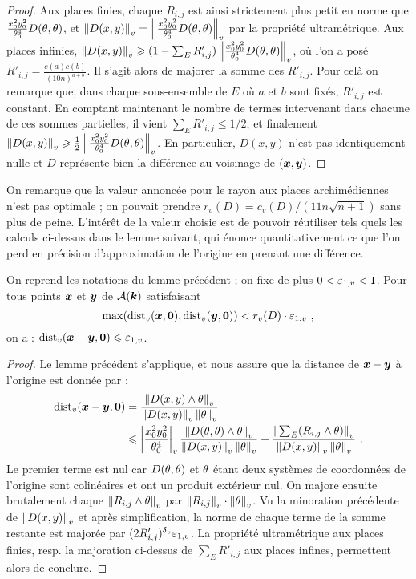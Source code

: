 \begin{proof}
  Aux places finies, chaque $R_{i, j}$ est ainsi strictement plus petit en
  norme que $\frac{x_0^2y_0^2}{\theta_0^4}D(\theta, \theta)$, et $\left\lVert D(x, y)\right\rVert_{v} =
  \left\lVert\frac{x_0^2y_0^2}{\theta_0^4}D(\theta, \theta)\right\rVert_{v}$ par la propriété
  ultramétrique.  Aux places infinies, $\left\lVert D(x, y)\right\rVert_{v} \geqslant (1-\sum_E R'_{i, j})
  \left\lVert\frac{x_0^2y_0^2}{\theta_0^4}D(\theta, \theta)\right\rVert_{v}$, où l'on a posé $R'_{i, j} =
  \frac{c(a)c(b)}{ \left( 10n \right)^{a+b}}$. Il s'agit alors de majorer la
  somme des $R'_{i, j}$. Pour celà on remarque que, dans chaque sous-ensemble
  de $E$ où $a$ et $b$ sont fixés, $R'_{i, j}$ est constant. En comptant
  maintenant le nombre de termes intervenant dans chacune de ces sommes
  partielles, il vient $\sum_E R'_{i, j} \le 1/2$, et finalement $\left\lVert D(x, y)\right\rVert_{v}
  \geqslant \frac{1}{2} \left\lVert\frac{x_0^2y_0^2}{\theta_0^4}D(\theta, \theta)\right\rVert_{v}$. En
  particulier, $D(x, y)$ n'est pas identiquement nulle et $D$ représente bien
  la différence au voisinage de $({\boldsymbol{x}}, {\boldsymbol{y}})$.
\end{proof}

On remarque que la valeur annoncée pour le rayon aux places archimédiennes
n'est pas optimale ; on pouvait prendre $r_v(D) = c_v(D)/(11n\sqrt{n+1})$ sans
plus de peine. L'intérêt de la valeur choisie est de pouvoir réutiliser tels
quels les calculs ci-dessus dans le lemme suivant, qui énonce quantitativement
ce que l'on perd en précision d'approximation de l'origine en prenant une
différence.

\begin{lem} \label{DistRel}
  On reprend les notations du lemme précédent ; on fixe de plus $0 < \varepsilon_{1,
  v} < 1$. Pour tous points ${\boldsymbol{x}}$ et ${\boldsymbol{y}}$ de $\mathcal{A}(\boldsymbol{k})$ satisfaisant
  \[
  \max ( \mathrm{dist}_v({\boldsymbol{x}}, {\boldsymbol{0}}), \mathrm{dist}_v({\boldsymbol{y}}, {\boldsymbol{0}}) ) < r_v(D) \cdot \varepsilon_{1,v} \text{ ,}
  \]
  on a : $\mathrm{dist}_v({\boldsymbol{x}}-{\boldsymbol{y}}, {\boldsymbol{0}}) \leqslant \varepsilon_{1,v}$.
\end{lem}


\begin{proof}
  Le lemme précédent s'applique, et nous assure que la distance de
  ${\boldsymbol{x}}-{\boldsymbol{y}}$ à l'origine  est donnée par :
  \begin{align*}
  \mathrm{dist}_v({\boldsymbol{x}}-{\boldsymbol{y}}, {\boldsymbol{0}}) & = \frac{\left\lVert D(x, y) \wedge \theta\right\rVert_{v}}{\left\lVert D(x,
    y)\right\rVert_{v}\left\lVert\theta\right\rVert_{v}} \\
  & \leqslant \left\lvert\frac{x_0^2y_0^2}{\theta_0^4}\right\rvert_{v}\frac{\left\lVert D(\theta, \theta)\wedge
    \theta\right\rVert_{v}}{\left\lVert D(x, y)\right\rVert_{v}\left\lVert\theta\right\rVert_{v}} + \frac{\left\lVert\sum_E (R_{i, j} \wedge
    \theta)\right\rVert_{v}}{\left\lVert D(x, y)\right\rVert_{v}\left\lVert\theta\right\rVert_{v}} \text{ .}
  \end{align*}
  Le premier terme est nul car $D(\theta, \theta)$ et $\theta$ étant deux systèmes
  de coordonnées de l'origine sont colinéaires et ont un produit extérieur
  nul. On majore ensuite brutalement chaque $\left\lVert R_{i, j} \wedge \theta\right\rVert_{v}$ par
  $\left\lVert R_{i, j}\right\rVert_{v} \cdot \left\lVert\theta\right\rVert_{v}$. Vu la minoration précédente de $\left\lVert D(x,
  y)\right\rVert_{v}$ et après simplification, la norme de chaque terme de la somme
  restante est majorée par $(2R'_{i, j})^{\delta_v} \varepsilon_{1, v}$. La propriété
  ultramétrique aux places finies, resp. la majoration ci-dessus de $\sum_E
  R'_{i, j}$ aux places infines, permettent alors de conclure.
\end{proof}

